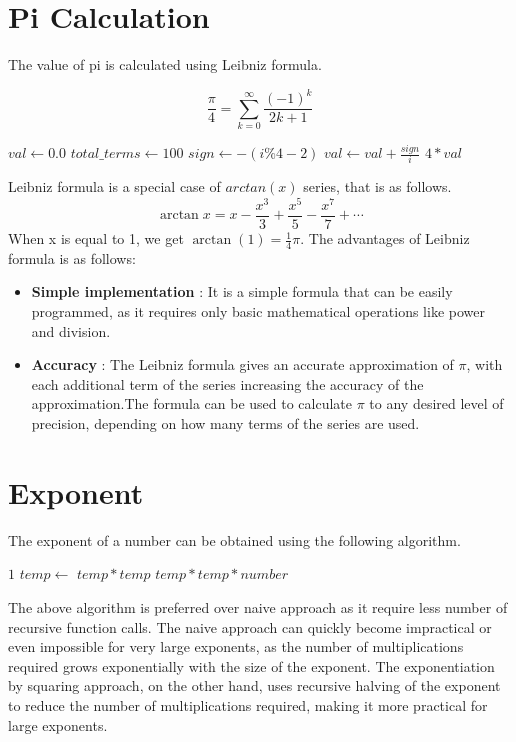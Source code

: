 \documentclass{report}
\begin{document}
\section{Pi Calculation}
\begin{flushleft}
  The value of pi is calculated using Leibniz formula.
\end{flushleft}
$${\frac {\pi }{4}}=\sum _{k=0}^{\infty }{\frac {(-1)^{k}}{2k+1}}$$
\begin{algorithmic}[1]
        \State $val \gets 0.0$
        \State $total\_terms \gets 100$
            \State $sign \gets -(i\%4-2)$
            \State $val \gets val + \frac{sign}{i}$
        \EndFor
        \State \Return $4 * val$
    \EndFunction
\end{algorithmic}
\begin{flushleft}
  Leibniz formula is a special case of $arctan(x)$ series, that is as follows.
  $$\arctan x=x-{\frac {x^{3}}{3}}+{\frac {x^{5}}{5}}-{\frac {x^{7}}{7}}+\cdots$$
  When x is equal to 1, we get $\arctan(1) = {\frac{1}{4}}\pi.$
  The advantages of Leibniz formula is as follows:
  \begin{itemize}
    \item \textbf{Simple implementation} : It is a simple formula that can be easily programmed, as it requires only basic mathematical operations like power and division.
    \item \textbf{Accuracy} : The Leibniz formula gives an accurate approximation of $\pi$, with each additional term of the series increasing the accuracy of the approximation.The formula can be used to calculate $\pi$ to any desired level of precision, depending on how many terms of the series are used.
  \end{itemize}
\end{flushleft}
\section{Exponent}
\begin{flushleft}
The exponent of a number can be obtained using the following algorithm.
\end{flushleft}
\begin{algorithmic}[1]
        \State \Return $1$
    \EndIf
    \State $temp \gets$ 
        \State \Return $temp * temp$
    \Else
        \State \Return $temp * temp * number$
    \EndIf
\EndFunction
\end{algorithmic}
\vspace{2cm}
\begin{flushleft}
  The above algorithm is preferred over naive approach as it require less number of recursive function calls.
  The naive approach can quickly become impractical or even impossible for very large exponents, as the number of multiplications required grows exponentially with the size of the exponent. The exponentiation by squaring approach, on the other hand, uses recursive halving of the exponent to reduce the number of multiplications required, making it more practical for large exponents.
\end{flushleft}
\end{document}

